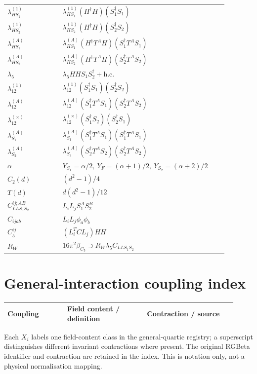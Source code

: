 \documentclass[10pt,a4paper]{article}
\begin{document}
\begin{longtable}{@{}p{0.23\linewidth}p{0.69\linewidth}@{}}
$\lambda_{HS_1}^{(1)}$ & $\lambda_{HS_1}^{(1)}(H^\dagger H)(S_1^\dagger S_1)$ \\
$\lambda_{HS_2}^{(1)}$ & $\lambda_{HS_2}^{(1)}(H^\dagger H)(S_2^\dagger S_2)$ \\
$\lambda_{HS_1}^{(A)}$ & $\lambda_{HS_1}^{(A)}(H^\dagger T^AH)(S_1^\dagger T^AS_1)$ \\
$\lambda_{HS_2}^{(A)}$ & $\lambda_{HS_2}^{(A)}(H^\dagger T^AH)(S_2^\dagger T^AS_2)$ \\
$\lambda_5$ & $\lambda_5HHS_1S_2^\dagger+\mathrm{h.c.}$ \\
$\lambda_{12}^{(1)}$ & $\lambda_{12}^{(1)}(S_1^\dagger S_1)(S_2^\dagger S_2)$ \\
$\lambda_{12}^{(A)}$ & $\lambda_{12}^{(A)}(S_1^\dagger T^AS_1)(S_2^\dagger T^AS_2)$ \\
$\lambda_{12}^{(\times)}$ & $\lambda_{12}^{(\times)}(S_1^\dagger S_2)(S_2^\dagger S_1)$ \\
$\lambda_{S_1}^{(A)}$ & $\lambda_{S_1}^{(A)}(S_1^\dagger T^A S_1)(S_1^\dagger T^A S_1)$ \\
$\lambda_{S_2}^{(A)}$ & $\lambda_{S_2}^{(A)}(S_2^\dagger T^A S_2)(S_2^\dagger T^A S_2)$ \\
$\alpha$ & $Y_{S_1}=\alpha/2,\ Y_F=(\alpha+1)/2,\ Y_{S_2}=(\alpha+2)/2$ \\
$C_2(d)$ & $(d^2-1)/4$ \\
$T(d)$ & $d(d^2-1)/12$ \\
$C_{LLS_1S_2}^{ij;AB}$ & $L_iL_jS_1^AS_2^B$ \\
$C_{ijab}$ & $L_iL_j\phi_a\phi_b$ \\
$C_5^{ij}$ & $(L_i^TCL_j)HH$ \\
$R_W$ & $16\pi^2\beta_{C_5}\supset R_W\lambda_5C_{LLS_1S_2}$ \\
\bottomrule
\end{longtable}
\section*{General-interaction coupling index}
\small
\begin{longtable}{@{}p{0.24\linewidth}p{0.32\linewidth}p{0.36\linewidth}@{}}
\toprule
Coupling & Field content / definition & Contraction / source \\
\midrule
\bottomrule
\end{longtable}
\normalsize
Each $X_i$ labels one field-content class in the general-quartic registry; a superscript distinguishes different invariant contractions where present. The original RGBeta identifier and contraction are retained in the index. This is notation only, not a physical normalisation mapping.
\clearpage
\clearpage
\end{document}
